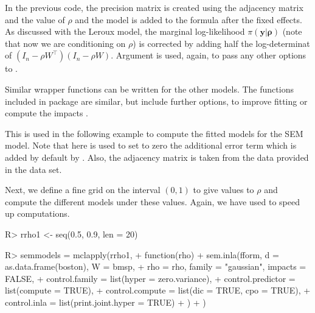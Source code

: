 \documentclass[article]{jss}
\begin{document}
In the previous code, the precision matrix  is created using the
adjacency matrix and the value of $\rho$ and the  model is added
to the formula after the fixed effects. As discussed with the Leroux model, the
marginal log-likelihood $\pi(\mathbf{y|\rho})$  (note that now we are
conditioning on $\rho$) is corrected by adding half the log-determinat of
$(I_n-\rho W^\top)(I_n-\rho W)$.  Argument  is used, again, to pass any other
options to .

Similar wrapper functions can be written for the other models. The functions
included in package  are similar, but include further options,
to improve fitting or compute the impacts 
\citep[see,][for details]{Bivandetal:2014}.

This is used in the following example to compute the fitted models
for the SEM model. Note that here  is used to set
to zero the additional error term which is added by default by .
Also, the adjacency matrix is taken from the data provided in the 
data set.

\begin{Schunk}
\end{Schunk}

Next, we define a fine grid on the interval $(0,1)$ to give values
to $\rho$ and compute the different models under these values. Again,
we have used   to speed up computations.


\begin{Schunk}
\begin{Sinput}
R> rrho1 <- seq(0.5, 0.9, len = 20)
\end{Sinput}
\end{Schunk}
\begin{Schunk}
\begin{Sinput}
R> semmodels = mclapply(rrho1,
+          function(rho) {
+                  sem.inla(fform, d = as.data.frame(boston), W = bmsp,
+  			rho = rho, family = "gaussian", impacts = FALSE,
+                          control.family = list(hyper = zero.variance),
+                          control.predictor = list(compute = TRUE),
+                          control.compute = list(dic = TRUE, cpo = TRUE),
+                          control.inla = list(print.joint.hyper = TRUE)
+                  )
+          })
\end{Sinput}
\end{Schunk}
\end{document}
